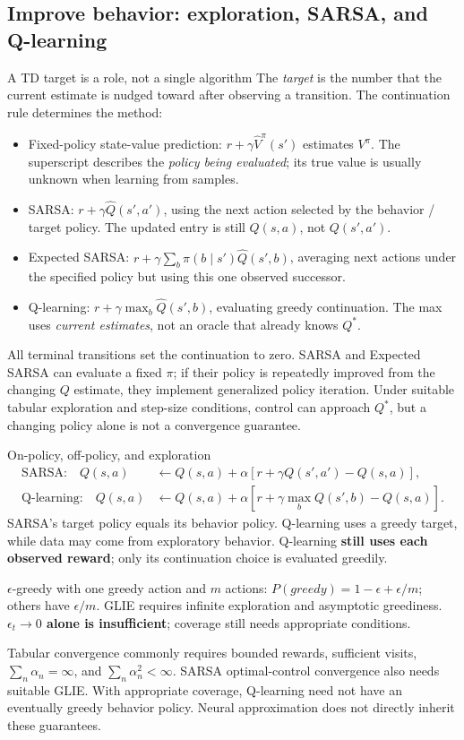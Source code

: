 \documentclass[10pt,a4paper]{article}
\begin{document}
\subsection{Improve behavior: exploration, SARSA, and Q-learning}
\begin{card}{A TD target is a role, not a single algorithm}
The \emph{target} is the number that the current estimate is nudged toward after observing a transition. The continuation rule determines the method:
\begin{itemize}
\item Fixed-policy state-value prediction: $r+\gamma\hat V^\pi(s')$ estimates $V^\pi$. The superscript describes the \emph{policy being evaluated}; its true value is usually unknown when learning from samples.
\item SARSA: $r+\gamma\hat Q(s',a')$, using the next action selected by the behavior / target policy. The updated entry is still $Q(s,a)$, not $Q(s',a')$.
\item Expected SARSA: $r+\gamma\sum_b\pi(b\mid s')\hat Q(s',b)$, averaging next actions under the specified policy but using this one observed successor.
\item Q-learning: $r+\gamma\max_b\hat Q(s',b)$, evaluating greedy continuation. The max uses \emph{current estimates}, not an oracle that already knows $Q^*$.
\end{itemize}
All terminal transitions set the continuation to zero. SARSA and Expected SARSA can evaluate a fixed $\pi$; if their policy is repeatedly improved from the changing $Q$ estimate, they implement generalized policy iteration. Under suitable tabular exploration and step-size conditions, control can approach $Q^*$, but a changing policy alone is not a convergence guarantee.
\end{card}
\begin{card}{On-policy, off-policy, and exploration}
\[
\begin{aligned}
\text{SARSA:}\quad Q(s,a)&\leftarrow Q(s,a)+\alpha[r+\gamma Q(s',a')-Q(s,a)],\\
\text{Q-learning:}\quad Q(s,a)&\leftarrow Q(s,a)+\alpha[r+\gamma\max_bQ(s',b)-Q(s,a)].
\end{aligned}
\]
SARSA's target policy equals its behavior policy. Q-learning uses a greedy target, while data may come from exploratory behavior. Q-learning \textbf{still uses each observed reward}; only its continuation choice is evaluated greedily.

$\epsilon$-greedy with one greedy action and $m$ actions: $P(greedy)=1-\epsilon+\epsilon/m$; others have $\epsilon/m$. GLIE requires infinite exploration and asymptotic greediness. \textbf{$\epsilon_t\to0$ alone is insufficient}; coverage still needs appropriate conditions.

Tabular convergence commonly requires bounded rewards, sufficient visits, $\sum_n\alpha_n=\infty$, and $\sum_n\alpha_n^2<\infty$. SARSA optimal-control convergence also needs suitable GLIE. With appropriate coverage, Q-learning need not have an eventually greedy behavior policy. Neural approximation does not directly inherit these guarantees.
\end{card}
\end{document}
